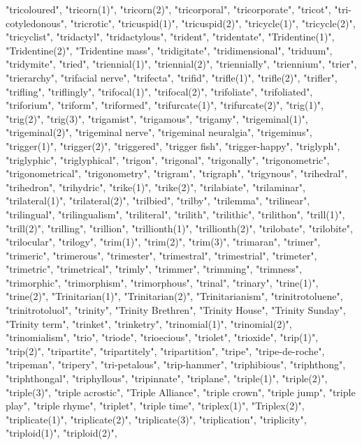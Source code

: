"tricoloured",
"tricorn(1)",
"tricorn(2)",
"tricorporal",
"tricorporate",
"tricot",
"tri-cotyledonous",
"tricrotic",
"tricuspid(1)",
"tricuspid(2)",
"tricycle(1)",
"tricycle(2)",
"tricyclist",
"tridactyl",
"tridactylous",
"trident",
"tridentate",
"Tridentine(1)",
"Tridentine(2)",
"Tridentine mass",
"tridigitate",
"tridimensional",
"triduum",
"tridymite",
"tried",
"triennial(1)",
"triennial(2)",
"triennially",
"triennium",
"trier",
"trierarchy",
"trifacial nerve",
"trifecta",
"trifid",
"trifle(1)",
"trifle(2)",
"trifler",
"trifling",
"triflingly",
"trifocal(1)",
"trifocal(2)",
"trifoliate",
"trifoliated",
"triforium",
"triform",
"triformed",
"trifurcate(1)",
"trifurcate(2)",
"trig(1)",
"trig(2)",
"trig(3)",
"trigamist",
"trigamous",
"trigamy",
"trigeminal(1)",
"trigeminal(2)",
"trigeminal nerve",
"trigeminal neuralgia",
"trigeminus",
"trigger(1)",
"trigger(2)",
"triggered",
"trigger fish",
"trigger-happy",
"triglyph",
"triglyphic",
"triglyphical",
"trigon",
"trigonal",
"trigonally",
"trigonometric",
"trigonometrical",
"trigonometry",
"trigram",
"trigraph",
"trigynous",
"trihedral",
"trihedron",
"trihydric",
"trike(1)",
"trike(2)",
"trilabiate",
"trilaminar",
"trilateral(1)",
"trilateral(2)",
"trilbied",
"trilby",
"trilemma",
"trilinear",
"trilingual",
"trilingualism",
"triliteral",
"trilith",
"trilithic",
"trilithon",
"trill(1)",
"trill(2)",
"trilling",
"trillion",
"trillionth(1)",
"trillionth(2)",
"trilobate",
"trilobite",
"trilocular",
"trilogy",
"trim(1)",
"trim(2)",
"trim(3)",
"trimaran",
"trimer",
"trimeric",
"trimerous",
"trimester",
"trimestral",
"trimestrial",
"trimeter",
"trimetric",
"trimetrical",
"trimly",
"trimmer",
"trimming",
"trimness",
"trimorphic",
"trimorphism",
"trimorphous",
"trinal",
"trinary",
"trine(1)",
"trine(2)",
"Trinitarian(1)",
"Trinitarian(2)",
"Trinitarianism",
"trinitrotoluene",
"trinitrotoluol",
"trinity",
"Trinity Brethren",
"Trinity House",
"Trinity Sunday",
"Trinity term",
"trinket",
"trinketry",
"trinomial(1)",
"trinomial(2)",
"trinomialism",
"trio",
"triode",
"trioecious",
"triolet",
"trioxide",
"trip(1)",
"trip(2)",
"tripartite",
"tripartitely",
"tripartition",
"tripe",
"tripe-de-roche",
"tripeman",
"tripery",
"tri-petalous",
"trip-hammer",
"triphibious",
"triphthong",
"triphthongal",
"triphyllous",
"tripinnate",
"triplane",
"triple(1)",
"triple(2)",
"triple(3)",
"triple acrostic",
"Triple Alliance",
"triple crown",
"triple jump",
"triple play",
"triple rhyme",
"triplet",
"triple time",
"triplex(1)",
"Triplex(2)",
"triplicate(1)",
"triplicate(2)",
"triplicate(3)",
"triplication",
"triplicity",
"triploid(1)",
"triploid(2)",
